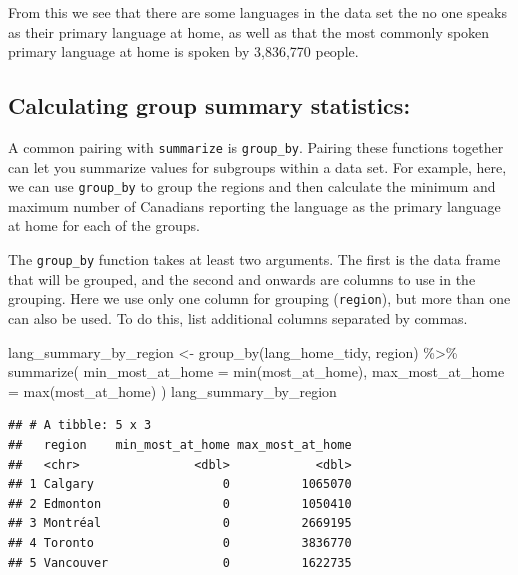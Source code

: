 \documentclass[
]{krantz}
\makeatletter
\newenvironment{Shaded}{\begin{snugshade}}{\end{snugshade}}
\newcommand{\AttributeTok}[1]{\textcolor[rgb]{0.61,0.61,0.61}{#1}}
\newcommand{\FunctionTok}[1]{\textcolor[rgb]{0,0,0}{#1}}
\newcommand{\NormalTok}[1]{#1}
\newcommand{\OtherTok}[1]{\textcolor[rgb]{0.37,0.37,0.37}{#1}}
\newcommand{\SpecialCharTok}[1]{\textcolor[rgb]{0,0,0}{#1}}
\newenvironment{kframe}{%
\medskip{}
\setlength{\fboxsep}{.8em}
 \def\at@end@of@kframe{}%
 \ifinner\ifhmode%
  \def\at@end@of@kframe{\end{minipage}}%
  \begin{minipage}{\columnwidth}%
 \fi\fi%
 \def\FrameCommand##1{\hskip\@totalleftmargin \hskip-\fboxsep
 \colorbox{shadecolor}{##1}\hskip-\fboxsep
     \hskip-\linewidth \hskip-\@totalleftmargin \hskip\columnwidth}%
 \MakeFramed {\advance\hsize-\width
   \@totalleftmargin\z@ \linewidth\hsize
   \@setminipage}}%
 {\par\unskip\endMakeFramed%
 \at@end@of@kframe}
\renewenvironment{Shaded}{\begin{kframe}}{\end{kframe}}
\makeatother
\begin{document}
From this we see that there are some languages in the data set the no one speaks
as their primary language at home, as well as that the most commonly spoken
primary language at home is spoken by 3,836,770
people.

\hypertarget{calculating-group-summary-statistics}{%
\subsection{Calculating group summary statistics:}\label{calculating-group-summary-statistics}}

A common pairing with \texttt{summarize} is \texttt{group\_by}. Pairing these functions together can let you summarize values for subgroups within a data set. For example, here, we can use \texttt{group\_by} to group the regions and then calculate the minimum and maximum number of Canadians reporting the language as the primary language at home for each of the groups.

The \texttt{group\_by} function takes at least two arguments. The first is the data frame that will be grouped, and the second and onwards are columns to use in the grouping. Here we use only one column for grouping (\texttt{region}), but more than one can also be used. To do this, list additional columns separated by commas.

\begin{Shaded}
\begin{Highlighting}[]
\NormalTok{lang\_summary\_by\_region }\OtherTok{\textless{}{-}} \FunctionTok{group\_by}\NormalTok{(lang\_home\_tidy, region) }\SpecialCharTok{\%\textgreater{}\%}
  \FunctionTok{summarize}\NormalTok{(}
    \AttributeTok{min\_most\_at\_home =} \FunctionTok{min}\NormalTok{(most\_at\_home),}
    \AttributeTok{max\_most\_at\_home =} \FunctionTok{max}\NormalTok{(most\_at\_home)}
\NormalTok{  )}
\NormalTok{lang\_summary\_by\_region}
\end{Highlighting}
\end{Shaded}

\begin{verbatim}
## # A tibble: 5 x 3
##   region    min_most_at_home max_most_at_home
##   <chr>                <dbl>            <dbl>
## 1 Calgary                  0          1065070
## 2 Edmonton                 0          1050410
## 3 Montréal                 0          2669195
## 4 Toronto                  0          3836770
## 5 Vancouver                0          1622735
\end{verbatim}
\end{document}
